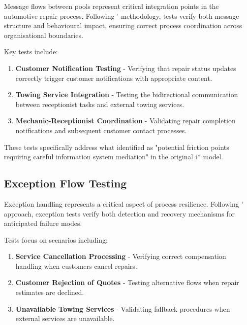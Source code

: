 \documentclass[14pt,a4paper]{article}
\begin{document}
Message flows between pools represent critical integration points in the automotive repair process. Following \textit{\parencite[p. 76]{Kumar2015}}' methodology, tests verify both message structure and behavioural impact, ensuring correct process coordination across organisational boundaries.

Key tests include:

\begin{enumerate}
    \item \textbf{Customer Notification Testing} - Verifying that repair status updates correctly trigger customer notifications with appropriate content.

    \item \textbf{Towing Service Integration} - Testing the bidirectional communication between receptionist tasks and external towing services.

    \item \textbf{Mechanic-Receptionist Coordination} - Validating repair completion notifications and subsequent customer contact processes.
\end{enumerate}

These tests specifically address what \textit{\parencite[p. 48]{Gorton2017}} identified as "potential friction points requiring careful information system mediation" in the original i* model.

\subsection{Exception Flow Testing}

Exception handling represents a critical aspect of process resilience. Following \textit{\parencite[p. 302]{Domingos2016}}' approach, exception tests verify both detection and recovery mechanisms for anticipated failure modes.

Tests focus on scenarios including:

\begin{enumerate}
    \item \textbf{Service Cancellation Processing} - Verifying correct compensation handling when customers cancel repairs.

    \item \textbf{Customer Rejection of Quotes} - Testing alternative flows when repair estimates are declined.

    \item \textbf{Unavailable Towing Services} - Validating fallback procedures when external services are unavailable.
\end{enumerate}
\end{document}
